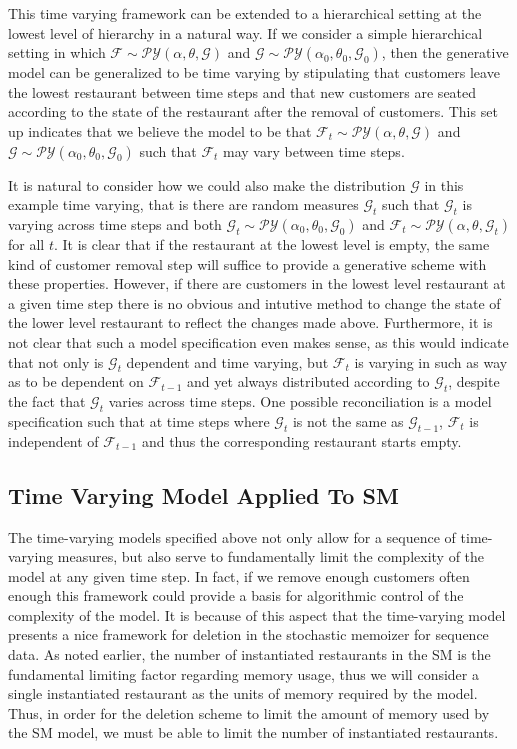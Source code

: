 \documentclass[12pt]{amsart}
\newcommand{\F}{\mathcal{F}}
\newcommand{\PY}{\mathcal{P}\mathcal{Y}}
\newcommand{\G}{\mathcal{G}}
\begin{document}
This time varying framework can be extended to a hierarchical setting at the lowest level of hierarchy in a natural way.  If we consider a simple hierarchical setting in which $\F \sim \PY(\alpha, \theta, \G)$ and $\G \sim \PY(\alpha_0, \theta_0, \G_0)$, then the generative model can be generalized to be time varying by stipulating that customers leave the lowest restaurant between time steps and that new customers are seated according to the state of the restaurant after the removal of customers.  This set up indicates that we believe the model to be that $\F_t \sim \PY(\alpha, \theta, \G)$ and $\G \sim \PY(\alpha_0, \theta_0, \G_0)$ such that $\F_t$ may vary between time steps.

It is natural to consider how we could also make the distribution $\G$ in this example time varying, that is there are random measures $\G_t$ such that $\G_t$ is varying across time steps and both $\G_t \sim \PY(\alpha_0, \theta_0, \G_0)$ and $\F_t \sim \PY(\alpha,\theta,\G_t)$ for all $t$.  It is clear that if the restaurant at the lowest level is empty, the same kind of customer removal step will suffice to provide a generative scheme with these properties.  However, if there are customers in the lowest level restaurant at a given time step there is no obvious and intutive method to change the state of the lower level restaurant to reflect the changes made above. Furthermore, it is not clear that such a model specification even makes sense, as this would indicate that not only is $\G_t$ dependent and time varying, but $\F_t$ is varying in such as way as to be dependent on $\F_{t-1}$ and yet always distributed according to $\G_t$, despite the fact that $\G_t$ varies across time steps.  One possible reconciliation is a model specification such that at time steps where $\G_t$ is not the same as $\G_{t-1}$, $\F_t$ is independent of $\F_{t-1}$ and thus the corresponding restaurant starts empty.

\subsection{Time Varying Model Applied To SM}

The time-varying models specified above not only allow for a sequence of time-varying measures, but also serve to fundamentally limit the complexity of the model at any given time step.  In fact, if we remove enough customers often enough this framework could provide a basis for algorithmic control of the complexity of the model.  It is because of this aspect that the time-varying model presents a nice framework for deletion in the stochastic memoizer for sequence data.  As noted earlier, the number of instantiated restaurants in the SM is the fundamental limiting factor regarding memory usage, thus we will consider a single instantiated restaurant as the units of memory required by the model.  Thus, in order for the deletion scheme to limit the amount of memory used by the SM model, we must be able to limit the number of instantiated restaurants.
\end{document}

